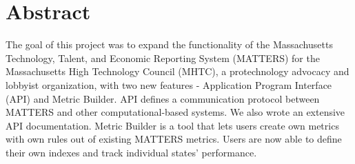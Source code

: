 \chapter*{Abstract}
	
The goal of this project was to expand the functionality of the Massachusetts 
Technology, Talent, and Economic Reporting System (MATTERS) for the 
Massachusetts High Technology Council (MHTC), a protechnology advocacy and 
lobbyist organization, with two new features - Application Program Interface
(API) and Metric Builder. API defines a communication protocol between MATTERS 
and other computational-based systems. We also wrote an extensive API 
documentation. Metric Builder is a tool that lets users create own metrics with
own rules out of existing MATTERS metrics. Users are now able to define their
own indexes and track individual states' performance.

